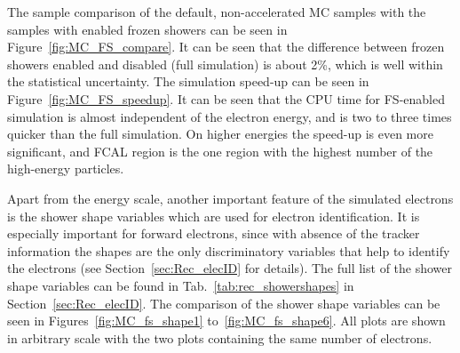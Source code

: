The sample comparison of the default, non-accelerated MC samples with the samples with enabled frozen showers can be seen in Figure~\ref{fig:MC_FS_compare}. It can be seen that the difference between frozen showers enabled and disabled (full simulation) is about 2\%, which is well within the statistical uncertainty. The simulation speed-up can be seen in Figure~\ref{fig:MC_FS_speedup}. It can be seen that the CPU time for FS-enabled simulation is almost independent of the electron energy, and is two to three times quicker than the full simulation. On higher energies the speed-up is even more significant, and FCAL region is the one region with the highest number of the high-energy particles.

Apart from the energy scale, another important feature of the simulated electrons is the shower shape variables which are used for electron identification. It is especially important for forward electrons, since with absence of the tracker information the shapes are the only discriminatory variables that help to identify the electrons (see Section~\ref{sec:Rec_elecID} for details). The full list of the shower shape variables can be found in Tab.~\ref{tab:rec_showershapes} in Section~\ref{sec:Rec_elecID}. The comparison of the shower shape variables can be seen in Figures~\ref{fig:MC_fs_shape1} to~\ref{fig:MC_fs_shape6}. All plots are shown in arbitrary scale with the two plots containing the same number of electrons.

\begin{figure}
\end{figure}


